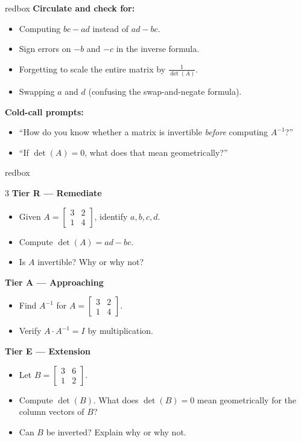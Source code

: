 \documentclass[10pt]{article}
\begin{document}
\begin{skillbox}{redbox}
    \textbf{Circulate and check for:}
    \begin{itemize}[leftmargin=1.2em, itemsep=2pt]
        \item Computing $bc - ad$ instead of $ad - bc$.
        \item Sign errors on $-b$ and $-c$ in the inverse formula.
        \item Forgetting to scale the entire matrix by $\tfrac{1}{\det(A)}$.
        \item Swapping $a$ and $d$ (confusing the swap-and-negate formula).
    \end{itemize}
    \textbf{Cold-call prompts:}
    \begin{itemize}[leftmargin=1.2em, itemsep=2pt]
        \item ``How do you know whether a matrix is invertible \emph{before} computing $A^{-1}$?''
        \item ``If $\det(A) = 0$, what does that mean geometrically?''
    \end{itemize}
\end{skillbox}

\begin{skillbox}{redbox}
\begin{multicols}{3}
\textbf{Tier R --- Remediate}
\begin{itemize}[leftmargin=1em, itemsep=2pt]
    \item Given $A=\begin{bmatrix}3&2\\1&4\end{bmatrix}$, identify $a,b,c,d$.
    \item Compute $\det(A) = ad - bc$.
    \item Is $A$ invertible? Why or why not?
\end{itemize}

\columnbreak
\textbf{Tier A --- Approaching}
\begin{itemize}[leftmargin=1em, itemsep=2pt]
    \item Find $A^{-1}$ for $A=\begin{bmatrix}3&2\\1&4\end{bmatrix}$.
    \item Verify $A \cdot A^{-1} = I$ by multiplication.
\end{itemize}

\columnbreak
\textbf{Tier E --- Extension}
\begin{itemize}[leftmargin=1em, itemsep=2pt]
    \item Let $B=\begin{bmatrix}3&6\\1&2\end{bmatrix}$.
    \item Compute $\det(B)$. What does $\det(B)=0$ mean geometrically for the column vectors of $B$?
    \item Can $B$ be inverted? Explain why or why not.
\end{itemize}
\end{multicols}
\end{skillbox}
\end{document}
